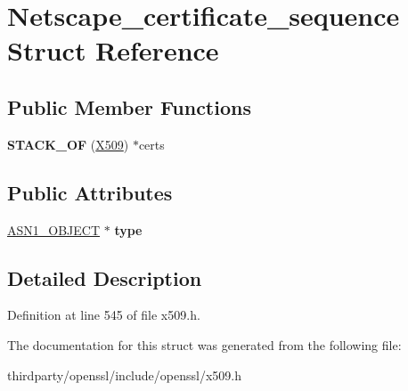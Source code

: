 \hypertarget{struct_netscape__certificate__sequence}{}\section{Netscape\+\_\+certificate\+\_\+sequence Struct Reference}
\label{struct_netscape__certificate__sequence}
\subsection*{Public Member Functions}
\begin{DoxyCompactItemize}
\item 
\mbox{\label{struct_netscape__certificate__sequence_a993513ed48036af06ded3de738b6b160}} 
{\bfseries S\+T\+A\+C\+K\+\_\+\+OF} (\hyperlink{structx509__st}{X509}) $\ast$certs
\end{DoxyCompactItemize}
\subsection*{Public Attributes}
\begin{DoxyCompactItemize}
\item 
\mbox{\label{struct_netscape__certificate__sequence_afd433b93f52456a10aaf3d824b295a94}} 
\hyperlink{structasn1__object__st}{A\+S\+N1\+\_\+\+O\+B\+J\+E\+CT} $\ast$ {\bfseries type}
\end{DoxyCompactItemize}


\subsection{Detailed Description}


Definition at line 545 of file x509.\+h.



The documentation for this struct was generated from the following file\+:\begin{DoxyCompactItemize}
\item 
thirdparty/openssl/include/openssl/x509.\+h\end{DoxyCompactItemize}
